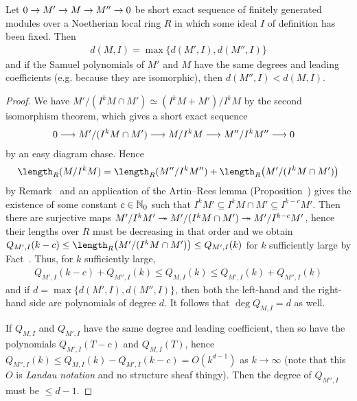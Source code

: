 \documentclass[a4paper,parskip=half,numbers=enddot, DIV=12, headheight=30pt]{scrreprt}
\begin{document}
\begin{cor}
    Let $0\morphism M'\morphism M \morphism M''\morphism 0$ be short exact sequence of finitely generated modules over a Noetherian local ring $R$ in which some ideal $I$ of definition has been fixed. Then 
    \begin{align*}
    	d(M,I) = \max\{d(M',I), d(M'',I)\}
    \end{align*}
    and if the Samuel polynomials of $M'$ and $M$ have the same degrees and leading coefficients (e.g. because they are isomorphic), then $d(M'',I) < d(M,I)$.
\end{cor}
\begin{proof}
    We have $M'/(I^kM\cap M')\simeq (I^kM+M')/I^kM$ by the second isomorphism theorem, which gives a short exact sequence
    \begin{align*}
        0 &\morphism M'/(I^kM\cap M') \morphism M/I^kM \morphism M''/I^kM'' \morphism 0
    \end{align*}
    by an easy diagram chase. Hence 
    \begin{align*}
    	\length_R(M/I^kM) = \length_R(M''/I^kM'') + \length_R\big(M'/(I^kM\cap M')\big)
    \end{align*}
    by Remark~ and an application of the Artin--Rees lemma (Proposition~) gives the existence of some constant $c\in \mathbb{N}_0$ such that $I^kM'\subseteq I^kM\cap M'\subseteq I^{k-c}M'$. Then there are surjective maps $M'/I^kM'\epimorphism M'/(I^kM\cap M')\epimorphism M'/I^{k-c}M'$, hence their lengths over $R$ must be decreasing in that order and we obtain $Q_{M',I}(k-c) \leq \length_R\big(M'/(I^kM\cap M')\big) \leq Q_{M',I}(k)$ for $k$ sufficiently large by Fact~. Thus, for $k$ sufficiently large,
    \begin{align*}
        Q_{M',I}(k-c) + Q_{M'',I}(k) \leq Q_{M,I}(k) \leq Q_{M',I}(k) + Q_{M'',I}(k)
    \end{align*}
    and if $d=\max\{d(M',I), d(M'',I)\}$, then both the left-hand and the right-hand side are polynomials of degree $d$. It follows that $\deg Q_{M,I}=d$ as well.
    
     If $Q_{M,I}$ and $Q_{M',I}$ have the same degree and leading coefficient, then so have the polynomials $Q_{M',I}(T-c)$ and $Q_{M,I}(T)$, hence $Q_{M'',I}(k)\leq Q_{M,I}(k)-Q_{M',I}(k-c)=O(k^{d-1})$ as $k\to\infty$ (note that this $O$ is \emph{Landau notation} and no structure sheaf thingy).
     Then the degree of $Q_{M'',I}$ must be $\leq d-1$.
\end{proof}
\end{document}
